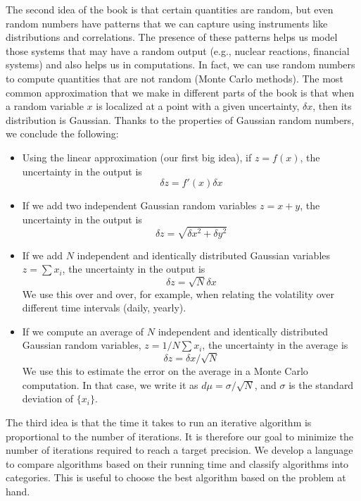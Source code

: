 \documentclass[justified,sixbynine]{tufte-book}
\theoremstyle{plain}%
\theoremstyle{definition}
\theoremstyle{remark}
\begin{document}
\begin{fullwidth}
The second idea of the book is that certain quantities are random, but even random numbers have patterns that we can capture using instruments like distributions and correlations. The presence of these patterns helps us model those systems that may have a random output (e.g., nuclear reactions, financial systems) and also helps us in computations. In fact, we can use random numbers to compute quantities that are not random (Monte Carlo methods). The most common approximation that we make in different parts of the book is that when a random variable $x$ is localized at a point with a given uncertainty, $\delta x$, then its distribution is Gaussian. Thanks to the properties of Gaussian random numbers, we conclude the following:
\begin{itemize}
\item Using the linear approximation (our first big idea), if $z=f(x)$, the uncertainty in the output is
\begin{equation}
\delta z = f'(x) \delta x
\end{equation}
\item If we add two independent Gaussian random variables $z=x+y$, the uncertainty in the output is
\begin{equation}
\delta z = \sqrt{\delta x^2 + \delta y^2}
\end{equation}
\item If we add $N$ independent and identically distributed Gaussian variables $z=\sum x_i$, the uncertainty in the output is
\begin{equation}
\delta z = \sqrt{N}\delta x
\end{equation}
We use this over and over, for example, when relating the volatility over different time intervals (daily, yearly).
\item If we compute an average of $N$ independent and identically distributed Gaussian random variables, $z=1/N \sum x_i$, the uncertainty in the average is
\begin{equation}
\delta z = \delta x/\sqrt{N}
\end{equation}
We use this to estimate the error on the average in a Monte Carlo computation. In that case, we write it as $d\mu = \sigma/\sqrt{N}$, and $\sigma$ is the standard deviation of $\{ x_i\}$.
\end{itemize}

The third idea is that the time it takes to run an iterative algorithm is proportional to the number of iterations. It is therefore our goal to minimize the number of iterations required to reach a target precision. We develop a language to compare algorithms based on their running time and classify algorithms into categories. This is useful to choose the best algorithm based on the problem at hand.


\end{fullwidth}
\end{document}
